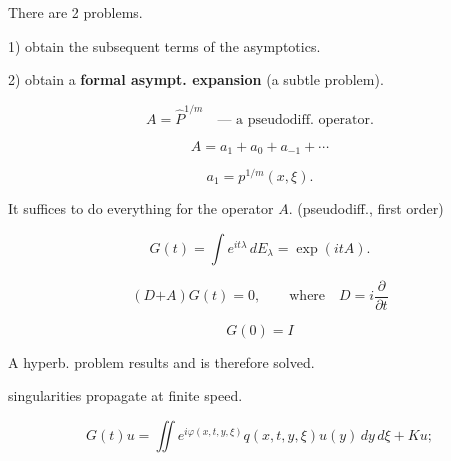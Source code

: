There are 2 problems.

1) obtain the subsequent terms of the asymptotics.

2) obtain a \textbf{formal asympt. expansion} (a subtle problem).

\begin{equation*}A=\hat P^{1/m}\quad\text{--- a pseudodiff. operator.}\end{equation*}

\begin{equation*}A=a_1+a_0+a_{-1}+\cdots\end{equation*}

\begin{equation*}a_1=p^{1/m}(x,\xi).\end{equation*}

It suffices to do everything for the operator $A$. (pseudodiff., first order)

\begin{equation*}G (t)=\int e^{it\lambda}\, dE_\lambda=\exp (itA).\end{equation*}


\begin{equation*}
(D\mathbin{\boldsymbol{+}}A)G (t)=0,\qquad\text{where}\quad D=i\frac{\partial}{\partial t}
\end{equation*}

\begin{equation*}G (0)=I\end{equation*}

A hyperb. problem results and is therefore solved.

 singularities propagate at finite speed.

\begin{equation*}
G (t)u=\iint e^{i\varphi (x, t, y,\xi)}q (x, t, y,\xi)u (y)\, dy\, d\xi+Ku;
\end{equation*}

